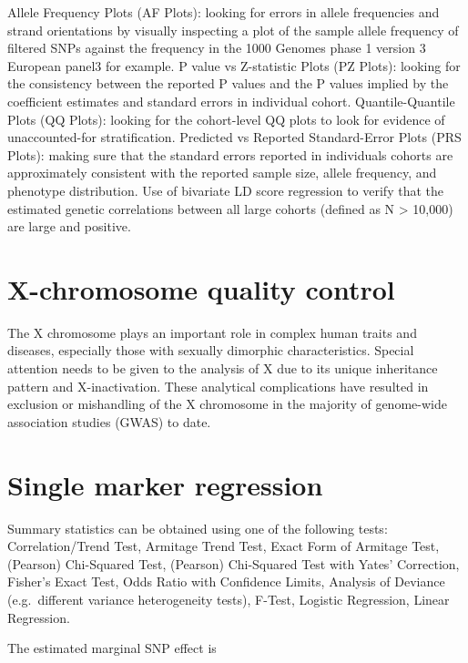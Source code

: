 \documentclass[
]{book}
\begin{document}
Allele Frequency Plots (AF Plots): looking for errors in allele frequencies and strand orientations by visually inspecting a plot of the sample allele frequency of filtered SNPs against the frequency in the 1000 Genomes phase 1 version 3 European panel3 for example.
P value vs Z-statistic Plots (PZ Plots): looking for the consistency between the reported P values and the P values implied by the coefficient estimates and standard errors in
individual cohort.
Quantile-Quantile Plots (QQ Plots): looking for the cohort-level QQ plots to look for evidence of unaccounted-for stratification.
Predicted vs Reported Standard-Error Plots (PRS Plots): making sure that the standard errors reported in individuals cohorts are approximately consistent with the reported sample size, allele frequency, and phenotype distribution.
Use of bivariate LD score regression to verify that the estimated genetic correlations between all large cohorts (defined as N \textgreater{} 10,000) are large and positive.

\hypertarget{x-chromosome-quality-control}{%
\section{X-chromosome quality control}\label{x-chromosome-quality-control}}

The X chromosome plays an important role in complex human traits and diseases, especially those with sexually dimorphic characteristics. Special attention needs to be given to the analysis of X due to its unique inheritance pattern and X-inactivation. These analytical complications have resulted in exclusion or mishandling of the X chromosome in the majority of genome-wide association studies (GWAS) to date.

\hypertarget{single-marker-regression}{%
\section{Single marker regression}\label{single-marker-regression}}

Summary statistics can be obtained using one of the following tests: Correlation/Trend Test, Armitage Trend Test, Exact Form of Armitage Test, (Pearson) Chi-Squared Test, (Pearson) Chi-Squared Test with Yates' Correction, Fisher's Exact Test, Odds Ratio with Confidence Limits, Analysis of Deviance (e.g.~different variance heterogeneity tests), F-Test, Logistic Regression, Linear Regression.

The estimated marginal SNP effect is
\end{document}
